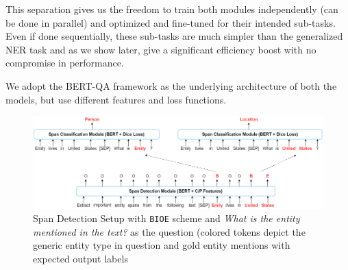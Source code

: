 This separation gives us the freedom to train both modules independently (can be done in parallel) and optimized and fine-tuned for their intended sub-tasks. Even if done sequentially, these sub-tasks are much simpler than the generalized NER task and as we show later, give a significant efficiency boost with no compromise in performance.

We adopt the BERT-QA framework as the underlying architecture of both the models, but
use different features and loss functions. 

\begin{figure}
    \centering
    \includegraphics[width=\linewidth]{framework5.png}
    \caption{Span Detection Setup with \texttt{BIOE} scheme and \textit{What is the entity mentioned in the text?} as the question (colored tokens depict the generic entity type in question and gold entity mentions with expected output labels}
    \label{fig:framework}
\end{figure}